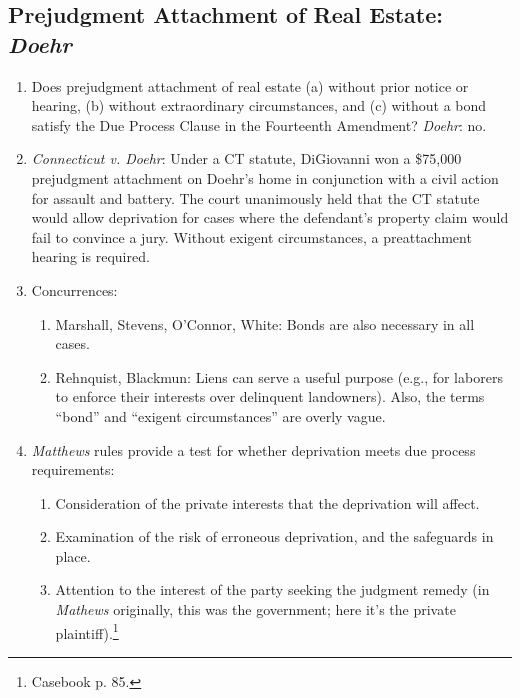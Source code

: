 \subsection{Prejudgment Attachment of Real Estate: \emph{Doehr}}

\begin{enumerate}
    \item Does prejudgment attachment of real estate (a) without prior notice 
    or hearing, (b) without extraordinary circumstances, and (c) without a 
    bond satisfy the Due Process Clause in the Fourteenth Amendment? 
    \emph{Doehr}: no.
    \item \emph{Connecticut v. Doehr}: Under a CT statute, DiGiovanni won a 
    \$75,000 prejudgment attachment on Doehr’s home in conjunction with a 
    civil action for assault and battery. The court unanimously held that the 
    CT statute would allow deprivation for cases where the defendant's 
    property claim would fail to convince a jury. Without exigent 
    circumstances, a preattachment hearing is required.
    \item Concurrences:
    \begin{enumerate}
        \item Marshall, Stevens, O'Connor, White: Bonds are also necessary in 
        all cases.
        \item Rehnquist, Blackmun: Liens can serve a useful purpose (e.g., for 
        laborers to enforce their interests over delinquent landowners). Also, 
        the terms ``bond'' and ``exigent circumstances'' are overly vague.
    \end{enumerate}
    \item \emph{Matthews} rules provide a test for whether deprivation meets 
    due process requirements:
    \begin{enumerate}
        \item Consideration of the private interests that the deprivation will 
        affect.
        \item Examination of the risk of erroneous deprivation, and the 
        safeguards in place.
        \item Attention to the interest of the party seeking the judgment 
        remedy (in \emph{Mathews} originally, this was the government; here 
        it's the private plaintiff).\footnote{Casebook p. 85.}
    \end{enumerate}
\end{enumerate}
